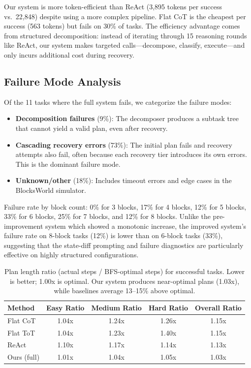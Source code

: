 \documentclass{article}
\begin{document}
Our system is more token-efficient than ReAct (3,895 tokens per success vs.\ 22,848) despite using a more complex pipeline. Flat CoT is the cheapest per success (563 tokens) but fails on 30\% of tasks. The efficiency advantage comes from structured decomposition: instead of iterating through 15 reasoning rounds like ReAct, our system makes targeted calls---decompose, classify, execute---and only incurs additional cost during recovery.

\subsection{Failure Mode Analysis}

Of the 11 tasks where the full system fails, we categorize the failure modes:

\begin{itemize}[leftmargin=*]
    \item \textbf{Decomposition failures} (9\%): The decomposer produces a subtask tree that cannot yield a valid plan, even after recovery.
    \item \textbf{Cascading recovery errors} (73\%): The initial plan fails and recovery attempts also fail, often because each recovery tier introduces its own errors. This is the dominant failure mode.
    \item \textbf{Unknown/other} (18\%): Includes timeout errors and edge cases in the BlocksWorld simulator.
\end{itemize}

Failure rate by block count: 0\% for 3 blocks, 17\% for 4 blocks, 12\% for 5 blocks, 33\% for 6 blocks, 25\% for 7 blocks, and 12\% for 8 blocks. Unlike the pre-improvement system which showed a monotonic increase, the improved system's failure rate on 8-block tasks (12\%) is lower than on 6-block tasks (33\%), suggesting that the state-diff prompting and failure diagnostics are particularly effective on highly structured configurations.

\begin{table}[h]
\centering
\begin{tabular}{lcccc}
\toprule
\textbf{Method} & \textbf{Easy Ratio} & \textbf{Medium Ratio} & \textbf{Hard Ratio} & \textbf{Overall Ratio} \\
\midrule
Flat CoT & 1.04x & 1.24x & 1.26x & 1.15x \\
Flat ToT & 1.04x & 1.23x & 1.40x & 1.15x \\
ReAct & 1.10x & 1.17x & 1.14x & 1.13x \\
Ours (full) & 1.01x & 1.04x & 1.05x & 1.03x \\
\bottomrule
\end{tabular}
\caption{Plan length ratio (actual steps / BFS-optimal steps) for successful tasks. Lower is better; 1.00x is optimal. Our system produces near-optimal plans (1.03x), while baselines average 13--15\% above optimal.}
\label{tab:optimality}
\end{table}
\end{document}
